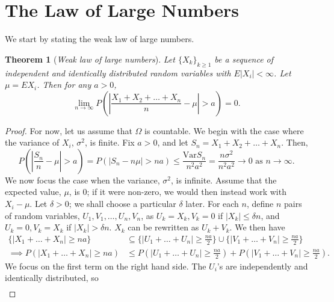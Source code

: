 \documentclass[15pt,a4paper]{book}
\newtheorem{theorem}{Theorem}[chapter]
\theoremstyle{definition}
\newcommand{\eax}[1]{\emph{#1}\index{#1}} %
\newcommand{\abs}[1]{\left| #1 \right|} %
\begin{document}
\section{The Law of Large Numbers}

We start by stating the weak law of large numbers.
\begin{theorem}[\eax{Weak law of large numbers}]
    Let $\{X_{k}\}_{k \geq 1}$ be a sequence of independent and identically distributed random variables with $E\abs{X_{i}} < \infty$. Let $\mu = EX_{i}$. Then for any $a > 0$,
    \begin{equation}
        \lim_{n \to \infty} P\left(\abs{\frac{X_{1}+X_{2}+\ldots+X_{n}}{n} - \mu} > a \right) = 0.
    \end{equation} 
\end{theorem}
\begin{proof}
    For now, let us assume that $\Omega$ is countable. We begin with the case where the variance of $X_{i}$, $\sigma^{2}$, is finite. Fix $a > 0$, and let $S_{n} = X_{1} + X_{2} + \ldots + X_{n}$. Then,
    \begin{equation}
        P\left(\abs{\frac{S_{n}}{n} - \mu} > a\right) = P(\abs{S_{n}-n\mu} > na) \leq \frac{\text{Var}S_{n}}{n^{2}a^{2}} = \frac{n\sigma^{2}}{n^{2}a^{2}} \to 0 \text{ as } n \to \infty.
    \end{equation}
    We now focus the case when the variance, $\sigma^{2}$, is infinite. Assume that the expected value, $\mu$, is 0; if it were non-zero, we would then instead work with $X_{i}-\mu$. Let $\delta > 0$; we shall choose a particular $\delta$ later. For each $n$, define $n$ pairs of random variables, $U_{1},V_{1}, \ldots, U_{n},V_{n}$, as $U_{k} = X_{k}, V_{k} = 0$ if $\abs{X_{k}} \leq \delta n$, and $U_{k} = 0, V_{k} = X_{k}$ if $\abs{X_{k}} > \delta n$. $X_{k}$ can be rewritten as $U_{k} + V_{k}$. We then have
    \begin{align}
        \{\abs{X_{1} + \ldots + X_{n}} \geq na\} &\subseteq \{\abs{U_{1} + \ldots + U_{n}} \geq \frac{na}{2}\} \cup \{\abs{V_{1} + \ldots + V_{n}} \geq \frac{na}{2}\} \\
        \implies P\left(\abs{X_{1} + \ldots + X_{n}} \geq na\right) &\leq P\left(\abs{U_{1} + \ldots + U_{n}} \geq \frac{na}{2}\right) + P\left(\abs{V_{1} + \ldots + V_{n}} \geq \frac{na}{2}\right).
    \end{align}
    We focus on the first term on the right hand side. The $U_{i}$'s are independently and identically distributed, so
    \begin{align}

\end{align}
\end{proof}
\end{document}
